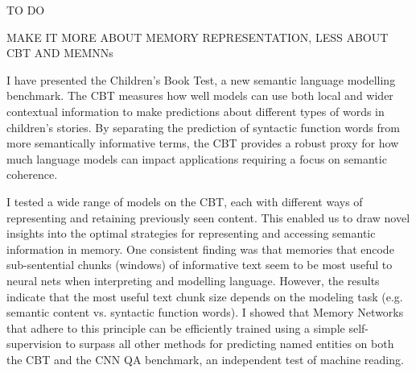TO DO

MAKE IT MORE ABOUT MEMORY REPRESENTATION, LESS ABOUT CBT AND MEMNNs

I have presented the Children's Book Test, a new semantic language modelling benchmark. The CBT measures how well models can use both local and wider contextual information to make predictions about different types of words in children's stories. By separating the prediction of syntactic function words from more semantically informative terms, the CBT provides a robust proxy for how much language models can impact applications requiring a focus on semantic coherence. 

I tested a wide range of models on the CBT, each with different ways of
representing and retaining previously seen content. This enabled us to draw novel insights into the optimal strategies for representing and accessing semantic information in memory. One consistent finding was that memories that encode sub-sentential chunks (windows) of informative text 
seem to be most useful to neural nets when interpreting and modelling language. 
However, the results indicate that the
most useful text chunk size depends on the modeling task 
(e.g. semantic content vs. syntactic function words).
% 
I showed that Memory Networks that adhere to this principle can be efficiently trained using a simple
self-supervision to surpass all other methods for predicting named
entities on both the CBT and the CNN QA
benchmark, an independent test of machine reading. 
%


